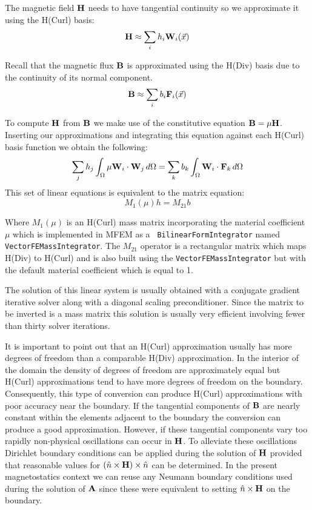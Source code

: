 \documentclass[12pt]{article}
\providecommand{\A}{\mbox{\bf A}}
\providecommand{\B}{\mbox{\bf B}}
\renewcommand{\H}{\mbox{\bf H}}
\providecommand{\F}{\mbox{\bf F}}
\providecommand{\W}{\mbox{\bf W}}
\providecommand{\x}{\vec{x}}
\begin{document}
The magnetic field $\H$ needs to have tangential continuity so we
approximate it using the H(Curl) basis:
\[\H\approx\sum_i h_i\W_i(\x)\]

Recall that the magnetic flux $\B$ is approximated using the H(Div)
basis due to the continuity of its normal component.
\[\B\approx\sum_i b_i\F_i(\x)\]

To compute $\H$ from $\B$ we make use of the constitutive equation
$\B=\mu\H$. Inserting our approximations and integrating this equation
against each H(Curl) basis function we obtain the following:
\[\sum_jh_j\int_\Omega\mu\W_i\cdot\W_j\,d\Omega =
\sum_kb_k\int_\Omega\W_i\cdot\F_k\,d\Omega\]
This set of linear equations is equivalent to the matrix equation:
\[M_1(\mu)h = M_{21}b\]

Where $M_1(\mu)$ is an H(Curl) mass matrix incorporating the material
coefficient $\mu$ which is implemented in MFEM as a {\tt
  BilinearFormIntegrator} named {\tt VectorFEMassIntegrator}. The
$M_{21}$ operator is a rectangular matrix which maps H(Div) to H(Curl)
and is also built using the {\tt VectorFEMassIntegrator} but with the 
default material coefficient which is equal to 1.

The solution of this linear system is usually obtained with a
conjugate gradient iterative solver along with a diagonal scaling
preconditioner. Since the matrix to be inverted is a mass matrix this
solution is usually very efficient involving fewer than thirty solver
iterations.

It is important to point out that an H(Curl) approximation usually has
more degrees of freedom than a comparable H(Div) approximation. In the
interior of the domain the density of degrees of freedom are
approximately equal but H(Curl) approximations tend to have more
degrees of freedom on the boundary. Consequently, this type of
conversion can produce H(Curl) approximations with poor accuracy near
the boundary. If the tangential components of $\B$ are nearly constant
within the elements adjacent to the boundary the conversion can
produce a good approximation. However, if these tangential components
vary too rapidly non-physical oscillations can occur in $\H$. To
alleviate these oscillations Dirichlet boundary conditions can be
applied during the solution of $\H$ provided that reasonable values
for $(\hat{n}\times\H)\times\hat{n}$ can be determined. In the present
magnetostatics context we can reuse any Neumann boundary conditions
used during the solution of $\A$ since these were equivalent to
setting $\hat{n}\times\H$ on the boundary.
\end{document}
